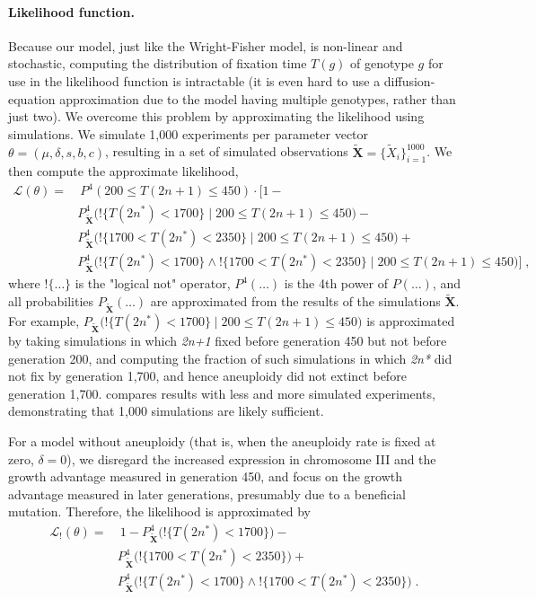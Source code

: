 \documentclass[12pt]{extarticle}
\let\vec\mathbf
\newcommand{\likelihood}{\mathcal{L}}
\newcommand{\anwt}{\emph{2n+1}}
\newcommand{\eumt}{\emph{2n*}}
\begin{document}
\paragraph{Likelihood function.} 
Because our model, just like the Wright-Fisher model, is non-linear and stochastic, computing the distribution of fixation time $T(g)$ of genotype $g$ for use in the likelihood function is intractable (it is even hard to use a diffusion-equation approximation due to the model having multiple genotypes, rather than just two).
We overcome this problem by approximating the likelihood using simulations. We simulate 1,000 experiments per parameter vector $\theta = (\mu, \delta, s, b, c)$, resulting in a set of simulated observations $\tilde{\vec X} = \{\tilde{X}_i\}_{i=1}^{1000}$. We then compute the approximate likelihood,
\begin{equation}\begin{aligned}
\label{eq:heatstress-likelihood}
\likelihood(\theta) = &\ P^4(200 \le T(2n+1) \le 450) \cdot 
	\Big[1 - \\
	&	P_{\tilde{\vec X}}^4\big(!\{T(2n^*)<1700\} \mid 200 \le T(2n+1) \le 450\big)- \\
	&	P_{\tilde{\vec X}}^4\big(!\{1700 < T(2n^*) < 2350\} \mid 200 \le T(2n+1) \le 450\big)+ \\
	&	P_{\tilde{\vec X}}^4\big(!\{T(2n^*)<1700\} \land !\{1700 < T(2n^*) < 2350\} \mid 200 \le T(2n+1) \le 450\big) 
	\Big]\;,
\end{aligned}\end{equation}
where $!\{\ldots\}$ is the "logical not" operator, $P^4(\ldots)$ is the 4th power of $P(\ldots)$, and all probabilities $P_{\tilde{\vec X}}(\ldots)$ are approximated from the results of the simulations $\tilde{\vec X}$. For example, $P_{\tilde{\vec X}}\big(!\{T(2n^*)<1700\} \mid 200 \le T(2n+1) \le 450\big)$ is approximated by taking simulations in which \anwt\; fixed before generation 450 but not before generation 200, and computing the fraction of such simulations in which \eumt\; did not fix by generation 1,700, and hence aneuploidy did not extinct before generation 1,700.
 compares results with less and more simulated experiments, demonstrating that 1,000 simulations are likely sufficient.
 
For a model without aneuploidy (that is, when the aneuploidy rate is fixed at zero, $\delta=0$), we disregard the increased expression in chromosome III and the growth advantage measured in generation 450, and focus on the growth advantage measured in later generations, presumably due to a beneficial mutation. 
Therefore, the likelihood is approximated by
\begin{equation}\begin{aligned}
\label{eq:heatstress-noaneuploidy-likelihood}
\likelihood_{!}(\theta) = &\ 
	1 - 
	P_{\tilde{\vec X}}^4\big(!\{T(2n^*)<1700\}\big) - \\
&	P_{\tilde{\vec X}}^4\big(!\{1700 < T(2n^*) < 2350\}\big) + \\
&	P_{\tilde{\vec X}}^4\big(!\{T(2n^*)<1700\} \land !\{1700 < T(2n^*) < 2350\}\big)
\;.
\end{aligned}\end{equation}
\end{document}
